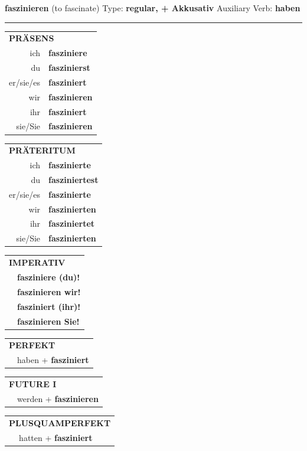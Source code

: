 \documentclass[10pt,a4paper]{revtex4-2}
\begin{document}
\begin{verbbox-acc}
{\Large \bf faszinieren} (to fascinate) \hfill Type: \textbf{regular, + Akkusativ} \hfill Auxiliary Verb: \textbf{haben}

\vspace{5pt}
\hrule
\vspace{5pt}

\begin{tabular}{rl}
\multicolumn{2}{l}{\textbf{PRÄSENS}}\\
ich & \textbf{fasziniere}\\
du & \textbf{faszinierst}\\
er/sie/es & \textbf{fasziniert}\\
wir & \textbf{faszinieren}\\
ihr & \textbf{fasziniert}\\
sie/Sie & \textbf{faszinieren}\\
\end{tabular}
\hfill
\begin{tabular}{rl}
\multicolumn{2}{l}{\textbf{PRÄTERITUM}}\\
ich & \textbf{faszinierte}\\
du & \textbf{fasziniertest}\\
er/sie/es & \textbf{faszinierte}\\
wir & \textbf{faszinierten}\\
ihr & \textbf{fasziniertet}\\
sie/Sie & \textbf{faszinierten}\\
\end{tabular}
\hfill
\begin{tabular}{rl}
\multicolumn{2}{l}{\textbf{IMPERATIV}}\\
& \textbf{fasziniere (du)!}\\
& \textbf{faszinieren wir!}\\
& \textbf{fasziniert (ihr)!}\\
& \textbf{faszinieren Sie!}\\
\end{tabular}

\vspace{10pt}

\begin{tabular}{rl}
\multicolumn{2}{l}{\textbf{PERFEKT}}\\
& haben + \textbf{fasziniert}\\
\end{tabular}
\hfill
\begin{tabular}{rl}
\multicolumn{2}{l}{\textbf{FUTURE I}}\\
& werden + \textbf{faszinieren}\\
\end{tabular}
\hfill
\begin{tabular}{rl}
\multicolumn{2}{l}{\textbf{PLUSQUAMPERFEKT}}\\
& hatten + \textbf{fasziniert}\\
\end{tabular}


\end{verbbox-acc}
\end{document}
